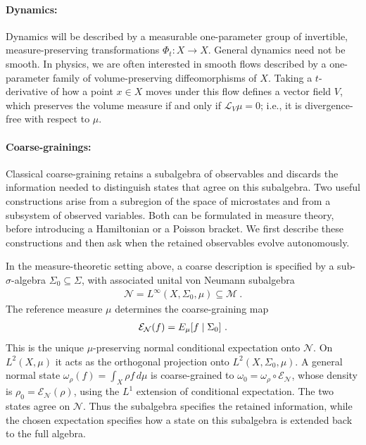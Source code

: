 \documentclass[a4paper,11pt]{article}
\theoremstyle{definition}
\newcommand{\mN}{\mathcal{N}}
\newcommand{\mM}{\mathcal{M}}
\newcommand{\mE}{\mathcal{E}}
\begin{document}
\paragraph{Dynamics:} Dynamics will be described by a measurable one-parameter group of invertible, measure-preserving transformations $\Phi_t:X\to X$. General dynamics need not be smooth. In physics, we are often interested in smooth flows described by a one-parameter family of volume-preserving diffeomorphisms of $X$. Taking a $t$-derivative of how a point $x\in X$ moves under this flow defines a vector field $V$, which preserves the volume measure if and only if $\mathcal{L}_V\mu=0$; i.e., it is divergence-free with respect to $\mu$.

\paragraph{Coarse-grainings:} Classical coarse-graining retains a subalgebra of observables and discards the information needed to distinguish states that agree on this subalgebra. Two useful constructions arise from a subregion of the space of microstates and from a subsystem of observed variables. Both can be formulated in measure theory, before introducing a Hamiltonian or a Poisson bracket. We first describe these constructions and then ask when the retained observables evolve autonomously.

In the measure-theoretic setting above, a coarse description is specified by a sub-$\sigma$-algebra $\Sigma_0\subseteq\Sigma$, with associated unital von Neumann subalgebra
\begin{align}
    \mN=L^\infty(X,\Sigma_0,\mu)\subseteq\mM\ .
\end{align}
The reference measure $\mu$ determines the coarse-graining map
\begin{align}
    \mE_{\mN}(f)=\mathbb \mE_\mu[f\mid\Sigma_0]\ .
\end{align}
This is the unique $\mu$-preserving normal conditional expectation onto $\mN$. On $L^2(X,\mu)$ it acts as the orthogonal projection onto $L^2(X,\Sigma_0,\mu)$. A general normal state $\omega_\rho(f)=\int_X\rho f\,d\mu$ is coarse-grained to $\omega_0=\omega_\rho\circ \mE_{\mN}$, whose density is $\rho_0=\mE_{\mN}(\rho)$, using the $L^1$ extension of conditional expectation. The two states agree on $\mN$. Thus the subalgebra specifies the retained information, while the chosen expectation specifies how a state on this subalgebra is extended back to the full algebra.
\end{document}
